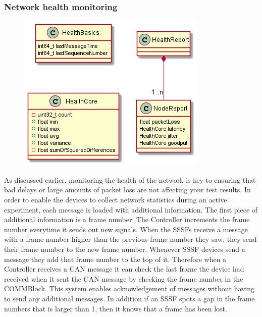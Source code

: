 \documentclass[letterpaper,twocolumn,10pt]{article}
\begin{document}
\subsubsection{Network health monitoring}\label{sec:nethealth}
\begin{figure}[t!]
    \centering
    \includegraphics[width=\linewidth]{out/images/network_health/network_health.png}
    \caption{}
    \label{fig:}
\end{figure}
As discussed earlier, monitoring the health of the network is key to ensuring that bad delays or large amounts of packet loss are not affecting your test results. In order to enable the devices to collect network statistics during an active experiment, each message is loaded with additional information. The first piece of additional information is a frame number. The Controller increments the frame number everytime it sends out new signals. When the SSSFs receive a message with a frame number higher than the previous frame number they saw, they send their frame number to the new frame number. Whenever SSSF devices send a message they add that frame number to the top of it. Therefore when a Controller receives a CAN message it can check the last frame the device had received when it sent the CAN message by checking the frame number in the COMMBlock. This system enables acknowledgement of messages without having to send any additional messages. In addition if an SSSF spots a gap in the frame numbers that is larger than 1, then it knows that a frame has been lost.
\end{document}
